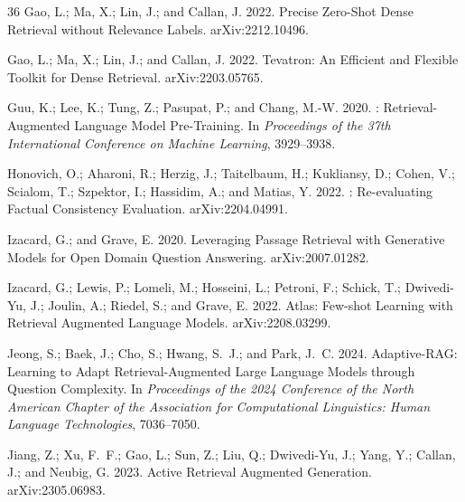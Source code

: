 \begin{thebibliography}{36}
Gao, L.; Ma, X.; Lin, J.; and Callan, J. 2022.
\newblock Precise Zero-Shot Dense Retrieval without Relevance Labels.
\newblock arXiv:2212.10496.

Gao, L.; Ma, X.; Lin, J.; and Callan, J. 2022.
\newblock Tevatron: An Efficient and Flexible Toolkit for Dense Retrieval.
\newblock arXiv:2203.05765.

Guu, K.; Lee, K.; Tung, Z.; Pasupat, P.; and Chang, M.-W. 2020.
: Retrieval-Augmented Language Model Pre-Training.
\newblock In \emph{Proceedings of the 37th International Conference on Machine Learning}, 3929--3938.

Honovich, O.; Aharoni, R.; Herzig, J.; Taitelbaum, H.; Kukliansy, D.; Cohen, V.; Scialom, T.; Szpektor, I.; Hassidim, A.; and Matias, Y. 2022.
: Re-evaluating Factual Consistency Evaluation.
\newblock arXiv:2204.04991.

Izacard, G.; and Grave, E. 2020.
\newblock Leveraging Passage Retrieval with Generative Models for Open Domain Question Answering.
\newblock arXiv:2007.01282.

Izacard, G.; Lewis, P.; Lomeli, M.; Hosseini, L.; Petroni, F.; Schick, T.; Dwivedi-Yu, J.; Joulin, A.; Riedel, S.; and Grave, E. 2022.
\newblock Atlas: Few-shot Learning with Retrieval Augmented Language Models.
\newblock arXiv:2208.03299.

Jeong, S.; Baek, J.; Cho, S.; Hwang, S.~J.; and Park, J.~C. 2024.
\newblock Adaptive-{RAG}: Learning to Adapt Retrieval-Augmented Large Language Models through Question Complexity.
\newblock In \emph{Proceedings of the 2024 Conference of the North American Chapter of the Association for Computational Linguistics: Human Language Technologies}, 7036--7050.

Jiang, Z.; Xu, F.~F.; Gao, L.; Sun, Z.; Liu, Q.; Dwivedi-Yu, J.; Yang, Y.; Callan, J.; and Neubig, G. 2023.
\newblock Active Retrieval Augmented Generation.
\newblock arXiv:2305.06983.


\end{thebibliography}
